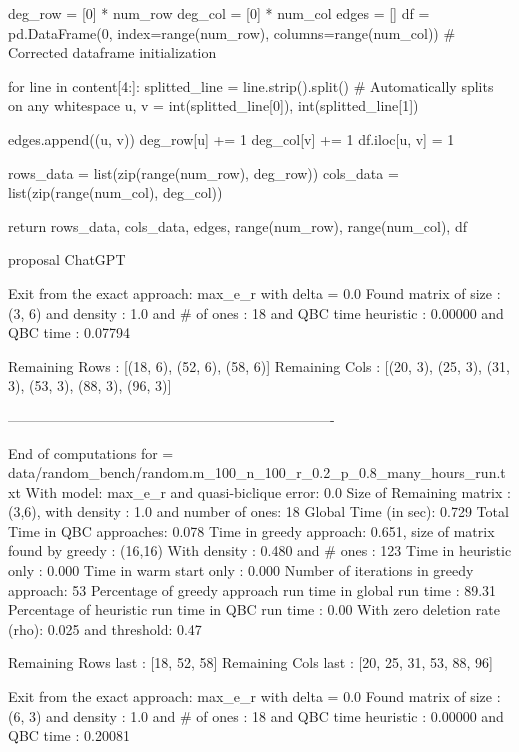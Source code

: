     deg_row = [0] * num_row
    deg_col = [0] * num_col
    edges = []
    df = pd.DataFrame(0, index=range(num_row), columns=range(num_col))  # Corrected dataframe initialization

    for line in content[4:]:
        splitted_line = line.strip().split()  # Automatically splits on any whitespace
        u, v = int(splitted_line[0]), int(splitted_line[1])
        
        edges.append((u, v))
        deg_row[u] += 1
        deg_col[v] += 1
        df.iloc[u, v] = 1 

    rows_data = list(zip(range(num_row), deg_row))
    cols_data = list(zip(range(num_col), deg_col))

    return rows_data, cols_data, edges, range(num_row), range(num_col), df
    
    proposal ChatGPT
    
    
        Exit from the exact approach: max_e_r
        with delta =  0.0
        Found matrix of size : (3, 6)
        and density : 1.0
        and # of ones : 18
        and QBC time heuristic  : 0.00000
        and QBC time  : 0.07794
        
 Remaining Rows  : [(18, 6), (52, 6), (58, 6)]
 Remaining  Cols  : [(20, 3), (25, 3), (31, 3), (53, 3), (88, 3), (96, 3)]

----------------------------------------------------------------------
 
    End of computations for = data/random_bench/random.m_100_n_100_r_0.2_p_0.8_many_hours_run.txt 
    With  model: max_e_r and quasi-biclique error: 0.0
    Size of Remaining matrix : (3,6), with  density : 1.0 and number of ones: 18
    Global Time (in sec): 0.729
    Total Time in QBC approaches: 0.078
    Time in greedy approach: 0.651,  size of matrix found by greedy : (16,16) 
    With density : 0.480 and # ones : 123 
    Time in heuristic only : 0.000 
    Time in warm start only : 0.000
    Number of iterations in greedy approach: 53
    Percentage of greedy approach run time in global run time : 89.31%
    Percentage of heuristic run time in QBC run time : 0.00%
    With zero deletion rate (rho): 0.025 and threshold: 0.47
    
 Remaining Rows last : [18, 52, 58]
 Remaining  Cols  last : [20, 25, 31, 53, 88, 96]
    
    
        Exit from the exact approach: max_e_r
        with delta =  0.0
        Found matrix of size : (6, 3)
        and density : 1.0
        and # of ones : 18
        and QBC time heuristic  : 0.00000
        and QBC time  : 0.20081
        
